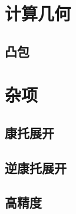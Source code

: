 \documentclass{article}
\begin{document}
\begin{multicols*}{3}
\section{计算几何}
\subsection{凸包}


\section{杂项}
\subsection{康托展开}


\subsection{逆康托展开}


\subsection{高精度}


\end{multicols*}
\end{document}
